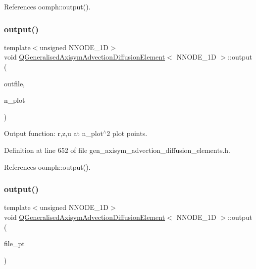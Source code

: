 References oomph\+::output().

\mbox{\label{classQGeneralisedAxisymAdvectionDiffusionElement_a8af9ea616644aac1a96d7e6647ce9cf5}} 
\subsubsection{\texorpdfstring{output()}{output()}\hspace{0.1cm}{\footnotesize\ttfamily [2/4]}}
{\footnotesize\ttfamily template$<$unsigned N\+N\+O\+D\+E\+\_\+1D$>$ \\
void \hyperlink{classQGeneralisedAxisymAdvectionDiffusionElement}{Q\+Generalised\+Axisym\+Advection\+Diffusion\+Element}$<$ N\+N\+O\+D\+E\+\_\+1D $>$\+::output (\begin{DoxyParamCaption}\item[{std\+::ostream \&}]{outfile,  }\item[{const unsigned \&}]{n\+\_\+plot }\end{DoxyParamCaption})\hspace{0.3cm}{\ttfamily [inline]}}



Output function\+: r,z,u at n\+\_\+plot$^\wedge$2 plot points. 



Definition at line 652 of file gen\+\_\+axisym\+\_\+advection\+\_\+diffusion\+\_\+elements.\+h.



References oomph\+::output().

\mbox{\label{classQGeneralisedAxisymAdvectionDiffusionElement_a50bc8d92910239c2fda6e65950042f05}} 
\subsubsection{\texorpdfstring{output()}{output()}\hspace{0.1cm}{\footnotesize\ttfamily [3/4]}}
{\footnotesize\ttfamily template$<$unsigned N\+N\+O\+D\+E\+\_\+1D$>$ \\
void \hyperlink{classQGeneralisedAxisymAdvectionDiffusionElement}{Q\+Generalised\+Axisym\+Advection\+Diffusion\+Element}$<$ N\+N\+O\+D\+E\+\_\+1D $>$\+::output (\begin{DoxyParamCaption}\item[{F\+I\+LE $\ast$}]{file\+\_\+pt }\end{DoxyParamCaption})\hspace{0.3cm}{\ttfamily [inline]}}



